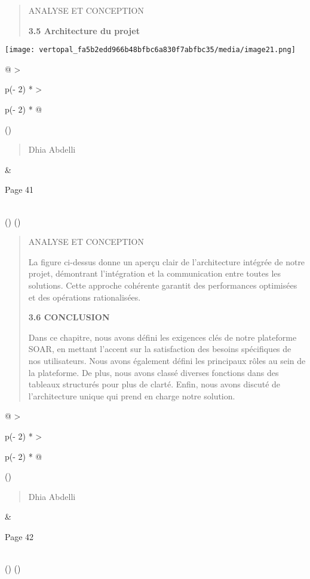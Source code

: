 \documentclass[
]{article}
\begin{document}
\begin{quote}
ANALYSE ET CONCEPTION

\textbf{3.5 Architecture du projet}
\end{quote}

\texttt{[image: vertopal\_fa5b2edd966b48bfbc6a830f7abfbc35/media/image21.png]}

\begin{longtable}[]{@{}
  >{\raggedright\arraybackslash}p{(\columnwidth - 2\tabcolsep) * }
  >{\raggedright\arraybackslash}p{(\columnwidth - 2\tabcolsep) * }@{}}
\toprule()
\begin{minipage}[b]{\linewidth}\raggedright
\begin{quote}
Dhia Abdelli
\end{quote}
\end{minipage} & \begin{minipage}[b]{\linewidth}\raggedright
Page 41
\end{minipage} \\
\midrule()
\endhead
\bottomrule()
\end{longtable}

\begin{quote}
ANALYSE ET CONCEPTION

La figure ci-dessus donne un aperçu clair de l'architecture intégrée de
notre projet, démontrant l'intégration et la communication entre toutes
les solutions. Cette approche cohérente garantit des performances
optimisées et des opérations rationalisées.

\textbf{3.6 CONCLUSION}

Dans ce chapitre, nous avons défini les exigences clés de notre
plateforme SOAR, en mettant l'accent sur la satisfaction des besoins
spécifiques de nos utilisateurs. Nous avons également défini les
principaux rôles au sein de la plateforme. De plus, nous avons classé
diverses fonctions dans des tableaux structurés pour plus de clarté.
Enfin, nous avons discuté de l'architecture unique qui prend en charge
notre solution.
\end{quote}

\begin{longtable}[]{@{}
  >{\raggedright\arraybackslash}p{(\columnwidth - 2\tabcolsep) * }
  >{\raggedright\arraybackslash}p{(\columnwidth - 2\tabcolsep) * }@{}}
\toprule()
\begin{minipage}[b]{\linewidth}\raggedright
\begin{quote}
Dhia Abdelli
\end{quote}
\end{minipage} & \begin{minipage}[b]{\linewidth}\raggedright
Page 42
\end{minipage} \\
\midrule()
\endhead
\bottomrule()
\end{longtable}
\end{document}
